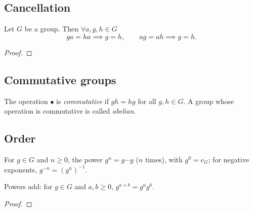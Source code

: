 \subsection{Cancellation}
\label{subsec:groups:cancellation}

\begin{proposition}[II.1.4, cancellation]
  \label{prop:groups:cancellation}
  \leanok
  Let $G$ be a group. Then $\forall a, g, h \in G$
  \[
    ga = ha \implies g = h, \qquad ag = ah \implies g = h.
  \]
\end{proposition}
\begin{proof}
  \leanok
\end{proof}

\subsection{Commutative groups}
\label{subsec:groups:commutative-groups}

\begin{definition}
  \label{def:groups:is-commutative}
  \leanok
  The operation $\bullet$ is \emph{commutative} if $gh = hg$ for all
  $g, h \in G$. A group whose operation is commutative is called
  \emph{abelian}.
\end{definition}

\subsection{Order}
\label{subsec:groups:order}

\begin{definition}[Powers]
  \label{def:groups:powers}
  \leanok
  For $g \in G$ and $n \geq 0$, the power $g^n = g \cdots g$ ($n$
  times), with $g^0 = e_G$; for negative exponents,
  $g^{-n} = (g^n)^{-1}$.
\end{definition}

\begin{proposition}
  \label{prop:groups:gpow-add}
  \leanok
  Powers add: for $g \in G$ and $a, b \geq 0$, $g^{a+b} = g^a g^b$.
\end{proposition}
\begin{proof}
  \leanok
\end{proof}

